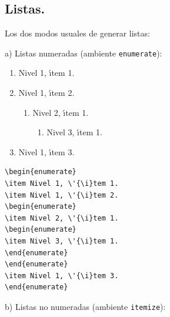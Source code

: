 \subsection{Listas.}
\label{listas}

Los dos modos usuales de generar listas:

\vspace{.3cm}
a) Listas numeradas (ambiente \verb+enumerate+):

\vspace{.5cm}
{\small
\begin{minipage}[t]{5.2cm}
\begin{enumerate}
\item Nivel 1, {\'\i}tem 1.
\item Nivel 1, {\'\i}tem 2.
\begin{enumerate}
\item Nivel 2, {\'\i}tem 1.
\begin{enumerate}
\item Nivel 3, {\'\i}tem 1.
\end{enumerate}
\end{enumerate}
\item Nivel 1, {\'\i}tem 3.
\end{enumerate}
\end{minipage}
\hspace{2cm}
\begin{minipage}[t]{7cm}
\begin{verbatim}
\begin{enumerate}
\item Nivel 1, \'{\i}tem 1.
\item Nivel 1, \'{\i}tem 2.
\begin{enumerate}
\item Nivel 2, \'{\i}tem 1.
\begin{enumerate}
\item Nivel 3, \'{\i}tem 1.
\end{enumerate}
\end{enumerate}
\item Nivel 1, \'{\i}tem 3.
\end{enumerate}
\end{verbatim}
\end{minipage}
}
\vspace{.5cm}

b) Listas no numeradas (ambiente \verb+itemize+):


